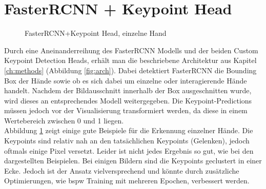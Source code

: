 \section{FasterRCNN + Keypoint Head}
\begin{figure}[!htb]
    \centering
    \caption{FasterRCNN+Keypoint Head, einzelne Hand}
    \label{fig:fasterrcnn_single}
\end{figure} 
Durch eine Aneinanderreihung des FasterRCNN Modells und der beiden Custom Keypoint Detection Heads, erhält man die beschriebene Architektur aus Kapitel \ref{ch:methods} (Abbildung \ref{fig:arch}).
Dabei detektiert FasterRCNN die Bounding Box der Hände sowie ob es sich dabei um einzelne oder interagierende Hände handelt.
Nachdem der Bildausschnitt innerhalb der Box ausgeschnitten wurde, wird dieses an entsprechendes Modell weitergegeben.
Die Keypoint-Predictions müssen jedoch vor der Visualisierung transformiert werden, da diese in einem Wertebereich zwischen 0 und 1 liegen.\\
Abbildung \ref{fig:fasterrcnn_single} zeigt einige gute Beispiele für die Erkennung einzelner Hände.
Die Keypoints sind relativ nah an den tatsächlichen Keypoints (Gelenken), jedoch oftmals einige Pixel versetzt.
Leider ist nicht jedes Ergebnis so gut, wie bei den dargestellten Beispielen.
Bei einigen Bildern sind die Keypoints geclustert in einer Ecke.
Jedoch ist der Ansatz vielversprechend und könnte durch zusätzliche Optimierungen, wie bspw Training mit mehreren Epochen, verbessert werden.\\

